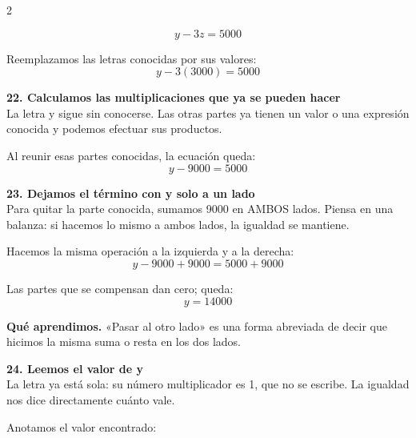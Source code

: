 \documentclass[11pt,a4paper,landscape]{article}
\begin{document}
\begin{multicols*}{2}
\begin{minipage}{\linewidth}
\[y - 3z = 5000\]
\par\smallskip Reemplazamos las letras conocidas por sus valores:
\[y - 3\left(3000\right)=5000\]
\end{minipage}\par\medskip
\noindent\begin{minipage}{\linewidth}\textbf{22. Calculamos las multiplicaciones que ya se pueden hacer}\\[2pt]La letra y sigue sin conocerse. Las otras partes ya tienen un valor o una expresión conocida y podemos efectuar sus productos.
\par{}\par\smallskip
\par\smallskip Al reunir esas partes conocidas, la ecuación queda:
\[y - 9000=5000\]
\end{minipage}\par\medskip
\noindent\begin{minipage}{\linewidth}\textbf{23. Dejamos el término con y solo a un lado}\\[2pt]Para quitar la parte conocida, sumamos 9000 en AMBOS lados. Piensa en una balanza: si hacemos lo mismo a ambos lados, la igualdad se mantiene.
\par\smallskip Hacemos la misma operación a la izquierda y a la derecha:
\[y - 9000 + 9000=5000 + 9000\]
\par\smallskip Las partes que se compensan dan cero; queda:
\[y=14000\]
\par\smallskip\textbf{Qué aprendimos.} «Pasar al otro lado» es una forma abreviada de decir que hicimos la misma suma o resta en los dos lados.
\end{minipage}\par\medskip
\noindent\begin{minipage}{\linewidth}\textbf{24. Leemos el valor de y}\\[2pt]La letra ya está sola: su número multiplicador es 1, que no se escribe. La igualdad nos dice directamente cuánto vale.
\par\smallskip Anotamos el valor encontrado:

\end{minipage}
\end{multicols*}
\end{document}
